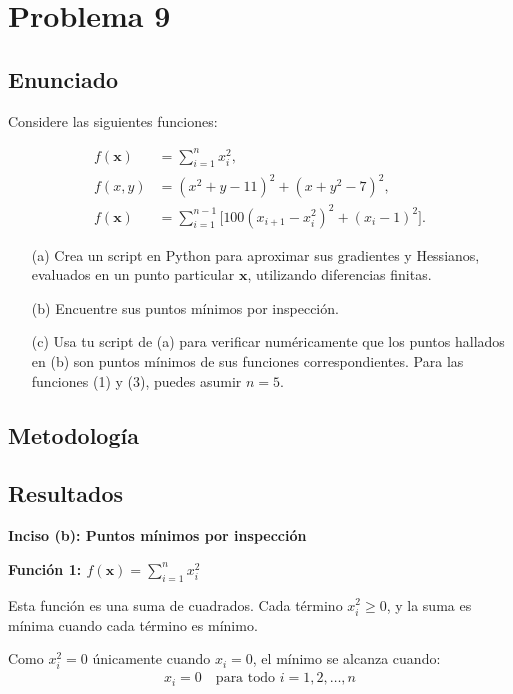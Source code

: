 \documentclass{article}
\begin{document}
\section{Problema 9}

\subsection{Enunciado}
\setcounter{equation}{0}
Considere las siguientes funciones:

\begin{align}
f(\mathbf{x}) &= \sum_{i=1}^{n} x_i^{2}, \label{eq:1}\\
f(x,y) &= (x^{2}+y-11)^{2} + (x+y^{2}-7)^{2}, \label{eq:2}\\
f(\mathbf{x}) &= \sum_{i=1}^{n-1} \bigl[100(x_{i+1}-x_i^{2})^{2} + (x_i-1)^{2}\bigr]. \label{eq:3}
\end{align}

\begin{enumerate}
  \item[(a)] Crea un script en Python para aproximar sus gradientes y Hessianos, evaluados en un punto particular $\mathbf{x}$, utilizando diferencias finitas.
  \item[(b)] Encuentre sus puntos mínimos por inspección.
  \item[(c)] Usa tu script de (a) para verificar numéricamente que los puntos hallados en (b) son puntos mínimos de sus funciones correspondientes. Para las funciones (1) y (3), puedes asumir $n=5$.
\end{enumerate}

\subsection{Metodología}

\subsection{Resultados}
\setcounter{equation}{0}

\textbf{Inciso (b): Puntos mínimos por inspección}

\textbf{Función 1: $f(\mathbf{x}) = \sum_{i=1}^{n} x_i^{2}$}

Esta función es una suma de cuadrados. Cada término $x_i^2 \geq 0$, y la suma es mínima cuando cada término es mínimo.

Como $x_i^2 = 0$ únicamente cuando $x_i = 0$, el mínimo se alcanza cuando:
\begin{align}
x_i = 0 \quad \text{para todo } i = 1, 2, \ldots, n
\end{align}
\end{document}
